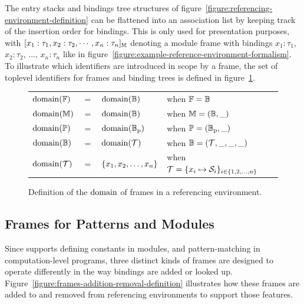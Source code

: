 The entry stacks and bindings tree structures of figure~\ref{figure:referencing-environment-definition} can be flattened into an association list by keeping track of the insertion order for bindings.
This is only used for presentation purposes, with $[x_1 : \tau_1, x_2 : \tau_2, \cdots, x_n : \tau_n]_{\mathbb{M}}$ denoting a module frame with bindings $x_1 : \tau_1$, $x_2 : \tau_2$, ..., $x_n : \tau_n$ like in figure~\ref{figure:example-reference-environment-formalism}.
To illustrate which identifiers are introduced in scope by a frame, the set of toplevel identifiers for frames and binding trees is defined in figure~\ref{figure:definition-domain-frames}.

\begin{figure}[H]
\centering
{\footnotesize
\begin{tabular}{lcll}
$\operatorname{domain}(\mathbb{F})$ & $=$ & $\operatorname{domain}(\mathbb{B})$ & when $\mathbb{F} = \mathbb{B}$\\
$\operatorname{domain}(\mathbb{M})$ & $=$ & $\operatorname{domain}(\mathbb{B})$ & when $\mathbb{M} = (\mathbb{B}, \_)$\\
$\operatorname{domain}(\mathbb{P})$ & $=$ & $\operatorname{domain}(\mathbb{B}_{\text{p}})$ & when $\mathbb{P} = (\mathbb{B}_{\text{p}}, \_)$\\
$\operatorname{domain}(\mathbb{B})$ & $=$ & $\operatorname{domain}(\mathcal{T})$ & when $\mathbb{B}=(\mathcal{T}, \_, \_, \_)$\\
$\operatorname{domain}(\mathcal{T})$ & $=$ & $\{x_1, x_2, \dots, x_n\}$ & when $\mathcal{T} = \{x_i \mapsto \mathcal{S}_i\}_{i \in \{1, 2, \dots, n\}}$
\end{tabular}
}
\caption[Definition of the domain of frames]{%
Definition of the $\operatorname{domain}$ of frames in a \Beluga referencing environment.
}
\label{figure:definition-domain-frames}
\end{figure}

\subsection{Frames for Patterns and Modules}


Since \Beluga supports defining constants in modules, and pattern-matching in computation-level programs, three distinct kinds of frames are designed to operate differently in the way bindings are added or looked up.
Figure~\ref{figure:frames-addition-removal-definition} illustrates how these frames are added to and removed from referencing environments to support those features.

